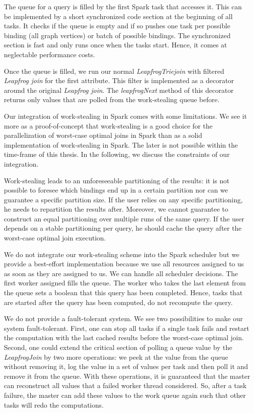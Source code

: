 The queue for a query is filled by the first Spark task that accesses it.
This can be implemented by a short synchronized code section at the beginning of all tasks.
It checks if the queue is empty and if so pushes one task per possible binding (all graph vertices) or batch of possible bindings.
The synchronized section is fast and only runs once when the tasks start.
Hence, it comes at neglectable performance costs.

Once the queue is filled, we run our normal \textit{LeapfrogTriejoin} with filtered \textit{Leapfrog join} for the first attribute.
This filter is implemented as a decorator around the original \textit{Leapfrog join}.
The \textit{leapfrogNext} method of this decorator returns only values that are polled from the work-stealing queue before.

Our integration of work-stealing in Spark comes with some limitations.
We see it more as a proof-of-concept that work-stealing is a good choice for the parallelization of worst-case optimal joins in Spark than
as a solid implementation of work-stealing in Spark.
The later is not possible within the time-frame of this thesis.
In the following, we discuss the constraints of our integration.

Work-stealing leads to an unforeseeable partitioning of the results: it is not possible to foresee which bindings end up in a certain
partition nor can we guarantee a specific partition size.
If the user relies on any specific partitioning, he needs to repartition the results after.
Moreover, we cannot guarantee to construct an equal partitioning over multiple runs of the same query.
If the user depends on a stable partitioning per query, he should cache the query after the worst-case optimal join execution.


We do not integrate our work-stealing scheme into the Spark scheduler but we provide a best-effort implementation because
we use all resources assigned to us as soon as they are assigned to us.
We can handle all scheduler decisions.
The first worker assigned fills the queue.
The worker who takes the last element from the queue sets a boolean that this query has been completed.
Hence, tasks that are started after the query has been computed, do not recompute the query.

We do not provide a fault-tolerant system.
We see two possibilities to make our system fault-tolerant.
First, one can stop all tasks if a single task fails and restart the computation with the last cached results before the worst-case
optimal join.
Second, one could extend the critical section of polling a queue value by the \textit{LeapfrogJoin} by two more operations: we peek
at the value from the queue without removing it, log the value in a set of values per task and then poll it and remove it from the queue.
With these operations, it is guaranteed that the master can reconstruct all values that a failed worker thread considered.
So, after a task failure, the master can add these values to the work queue again such that other tasks will redo the computations.

